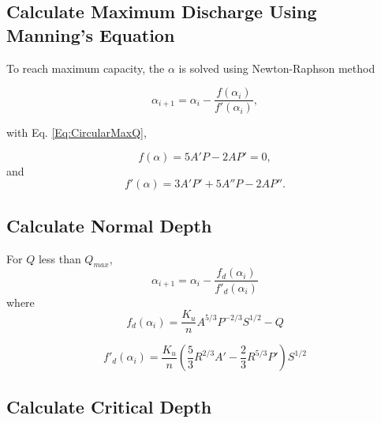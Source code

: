 \subsection{Calculate Maximum Discharge Using Manning's Equation}

To reach maximum capacity, the $\alpha$ is solved using Newton-Raphson method

\begin{equation}  
\alpha _{i+1} = \alpha _i - \frac{f(\alpha _i)}{f'(\alpha_i)},
\end{equation}

with Eq. \ref{Eq:CircularMaxQ},

\begin{equation}  
f(\alpha) = 5A'P -  2AP' = 0,
\end{equation}
and
\begin{equation}  
f'(\alpha) = 3A'P' + 5A''P - 2AP''.
\end{equation}

\subsection{Calculate Normal Depth}
For $Q$ less than $Q_{max}$,
\begin{equation}  
\alpha_{i+1} = \alpha_i -\frac{f_d(\alpha_{i})}{f'_d(\alpha_{i})}
\end{equation}
where
\begin{equation}  
f_d(\alpha_{i})= \frac{K_u}{n}A^{5/3}P^{-2/3}S^{1/2} - Q 
\end{equation}

\begin{equation}  
f'_d(\alpha_{i})= \frac{K_u}{n}\left(\frac{5}{3}R^{2/3}A' -  \frac{2}{3}R^{5/3}P'\right)S^{1/2}
\end{equation}



\subsection{Calculate Critical Depth}

